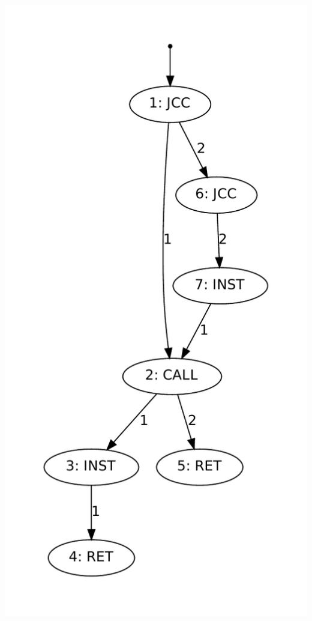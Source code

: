  \begin{center}
\includegraphics[height=0.4\textheight]{supports/algos/images/g1prof.pdf}

\end{center}

